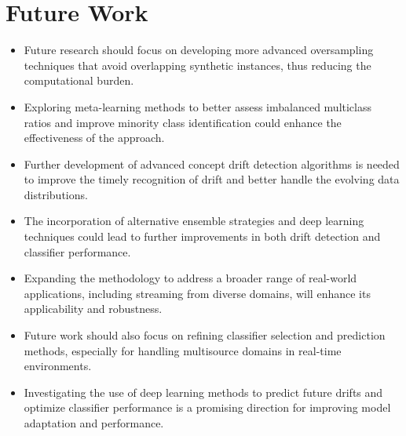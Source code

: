 \section{Future Work}
\label{section:7_2}
\begin{itemize}
    \setlength{\itemsep}{1.5pt}
    \setlength{\parskip}{1.5pt}
    \item Future research should focus on developing more advanced oversampling techniques that avoid overlapping synthetic instances, thus reducing the computational burden.
    \item Exploring meta-learning methods to better assess imbalanced multiclass ratios and improve minority class identification could enhance the effectiveness of the approach.
    \item Further development of advanced concept drift detection algorithms is needed to improve the timely recognition of drift and better handle the evolving data distributions.
    \item The incorporation of alternative ensemble strategies and deep learning techniques could lead to further improvements in both drift detection and classifier performance.
    \item Expanding the methodology to address a broader range of real-world applications, including streaming from diverse domains, will enhance its applicability and robustness.
    \item Future work should also focus on refining classifier selection and prediction methods, especially for handling multisource domains in real-time environments.
    \item Investigating the use of deep learning methods to predict future drifts and optimize classifier performance is a promising direction for improving model adaptation and performance.
\end{itemize}




